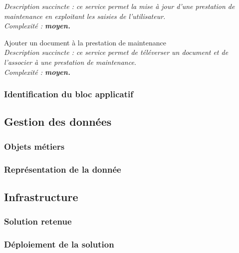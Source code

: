 \begin{description}
        \it{Description succincte :} ce service permet la mise à jour d’une prestation de maintenance en exploitant les saisies de l’utilisateur. \\
        \it{Complexité :} \bf{moyen}.
    \item[\textbullet] Ajouter un document à la prestation de maintenance \\
        \it{Description succincte :} ce service permet de téléverser un document et de l’associer à une prestation de maintenance. \\
        \it{Complexité :} \bf{moyen}.
\end{description}

\subsubsection{Identification du bloc applicatif}


\subsection{Gestion des données}

\subsubsection{Objets métiers}


\subsubsection{Représentation de la donnée}


\subsection{Infrastructure}

\subsubsection{Solution retenue}


\subsubsection{Déploiement de la solution}

